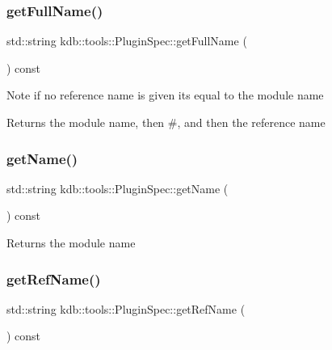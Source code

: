\subsubsection{\texorpdfstring{get\+Full\+Name()}{getFullName()}}
{\footnotesize\ttfamily std\+::string kdb\+::tools\+::\+Plugin\+Spec\+::get\+Full\+Name (\begin{DoxyParamCaption}{ }\end{DoxyParamCaption}) const}

\begin{DoxyNote}{Note}
if no reference name is given its equal to the module name
\end{DoxyNote}
\begin{DoxyReturn}{Returns}
the module name, then \#, and then the reference name 
\end{DoxyReturn}
\mbox{\label{classkdb_1_1tools_1_1PluginSpec_a0cfae078fe25b383590bd0a9f679068d}} 
\subsubsection{\texorpdfstring{get\+Name()}{getName()}}
{\footnotesize\ttfamily std\+::string kdb\+::tools\+::\+Plugin\+Spec\+::get\+Name (\begin{DoxyParamCaption}{ }\end{DoxyParamCaption}) const}

\begin{DoxyReturn}{Returns}
the module name 
\end{DoxyReturn}
\mbox{\label{classkdb_1_1tools_1_1PluginSpec_a8792bc54b8e73490b1bad607de756d35}} 
\subsubsection{\texorpdfstring{get\+Ref\+Name()}{getRefName()}}
{\footnotesize\ttfamily std\+::string kdb\+::tools\+::\+Plugin\+Spec\+::get\+Ref\+Name (\begin{DoxyParamCaption}{ }\end{DoxyParamCaption}) const}

